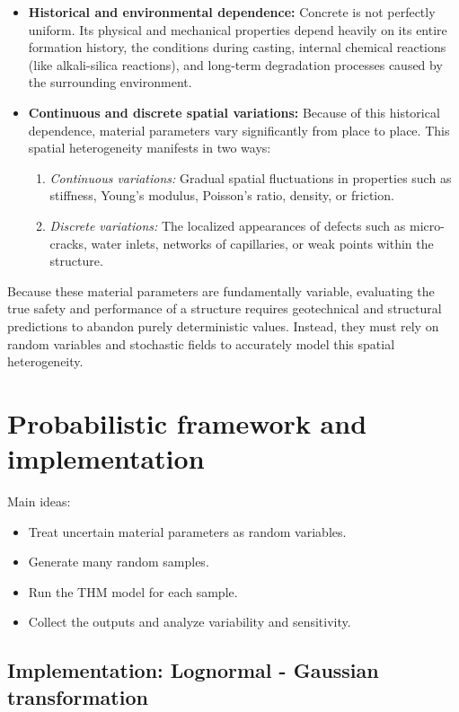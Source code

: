 \documentclass[a4paper,12pt,twoside]{report}     %
\begin{document}
\begin{itemize}
    \item \textbf{Historical and environmental dependence:} Concrete is not perfectly uniform. Its physical and mechanical properties depend heavily on its entire formation history, the conditions during casting, internal chemical reactions (like alkali-silica reactions), and long-term degradation processes caused by the surrounding environment.
    
    \item \textbf{Continuous and discrete spatial variations:} Because of this historical dependence, material parameters vary significantly from place to place. This spatial heterogeneity manifests in two ways:
    \begin{enumerate}
        \item \textit{Continuous variations:} Gradual spatial fluctuations in properties such as stiffness, Young's modulus, Poisson's ratio, density, or friction.
        \item \textit{Discrete variations:} The localized appearances of defects such as micro-cracks, water inlets, networks of capillaries, or weak points within the structure.
    \end{enumerate}
\end{itemize}

Because these material parameters are fundamentally variable, evaluating the true safety and performance of a structure requires geotechnical and structural predictions to abandon purely deterministic values. Instead, they must rely on random variables and stochastic fields to accurately model this spatial heterogeneity.

\section{Probabilistic framework and implementation}
Main ideas:
\begin{itemize}
    \item Treat uncertain material parameters as random variables.
    \item Generate many random samples.
    \item Run the THM model for each sample.
    \item Collect the outputs and analyze variability and sensitivity.
\end{itemize}

\subsection{Implementation: Lognormal - Gaussian transformation}
\end{document}
